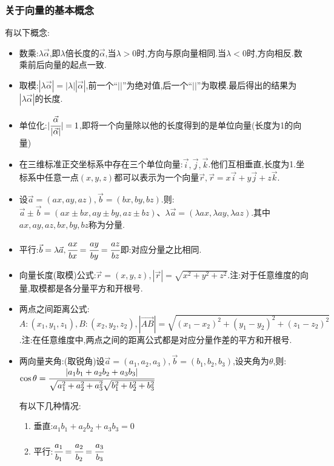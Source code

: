 \documentclass[UTF8,12pt]{ctexbook}
\begin{document}
{{{    \subsubsection{关于向量的基本概念}{
      有以下概念:
      \begin{itemize}
        \item 数乘:$\lambda \vec{\alpha}$,即$\lambda$倍长度的$\vec{\alpha}$,当$\lambda > 0$时,方向与原向量相同.当$\lambda < 0$时,方向相反.数乘前后向量的起点一致.
        \item 取模:$|\lambda\vec{\alpha}| = |\lambda||\vec{\alpha}|$,前一个“$||$”为绝对值,后一个“$||$”为取模.最后得出的结果为$|\lambda\vec{\alpha}|$的长度.
        \item 单位化:$|\cfrac{\vec{\alpha}}{|\vec{\alpha}|}| = 1$,即将一个向量除以他的长度得到的是单位向量(长度为1的向量)
        \item 在三维标准正交坐标系中存在三个单位向量:$\vec{i},\vec{j},\vec{k}$.他们互相垂直,长度为1.坐标系中任意一点$(x,y,z)$都可以表示为一个向量$\vec{r},\vec{r} = x\vec{i} + y\vec{j} + z\vec{k}$.
        \item 设$\vec{a} = (ax,ay,az),\vec{b} = (bx,by,bz)$.则:$\vec{a} \pm \vec{b} = (ax \pm bx,ay \pm by,az \pm bz)$、$\lambda\vec{a} = (\lambda ax,\lambda ay,\lambda az)$.其中$ax,ay,az,bx,by,bz$称为分量.
        \item 平行:$\vec{b} = \lambda\vec{a},\cfrac{ax}{bx} = \cfrac{ay}{by} = \cfrac{az}{bz}$即:对应分量之比相同.
        \item 向量长度(取模)公式:$\vec{r} = (x,y,z),|\vec{r}| = \sqrt{x^2 + y^2 + z^2}$.注:对于任意维度的向量,取模都是各分量平方和开根号.
        \item 两点之间距离公式:$A:(x_1,y_1,z_1),B:(x_2,y_2,z_2),|\vec{AB}| = \sqrt{(x_1 - x_2)^2 + (y_1 -y_2)^2 + (z_1 - z_2)^2}$.注:在任意维度中,两点之间的距离公式都是对应分量作差的平方和开根号.
        \item {
              两向量夹角:(取锐角)设$\vec{a} = (a_1, a_2, a_3),\vec{b} = (b_1,b_2,b_3)$,设夹角为$\theta$,则:$\cos\theta = \cfrac{|a_1b_1 + a_2b_2 + a_3b_3|}{\sqrt{a_1^2 + a_2^2 + a_3^2}\sqrt{b_1^2 + b_2^2 + b_3^2}}$

              有以下几种情况:
              \begin{enumerate}
                \item 垂直:$a_1b_1 + a_2b_2 + a_3b_3 = 0$
                \item 平行:$\cfrac{a_1}{b_1} = \cfrac{a_2}{b_2} = \cfrac{a_3}{b_3}$
              \end{enumerate}

}
\end{itemize}}}}}
\end{document}
